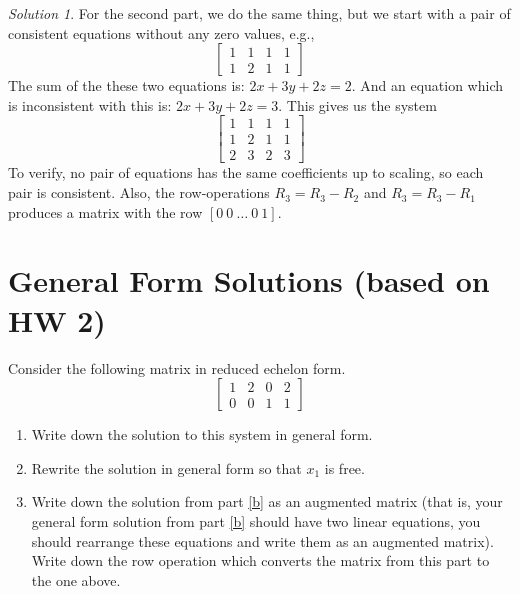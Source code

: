 \documentclass{article}
\theoremstyle{remark}
\newtheorem*{solution}{Solution}
\begin{document}
\begin{solution}
  For the second part, we do the same thing, but we start with a pair of consistent equations without any zero values, e.g.,
  \begin{displaymath}
    \begin{bmatrix}
      1 & 1 & 1 & 1 \\
      1 & 2 & 1 & 1
    \end{bmatrix}
  \end{displaymath}
  The sum of the these two equations is: $2x + 3y + 2z = 2$.
  And an equation which is inconsistent with this is: $2x + 3y + 2z = 3$.
  This gives us the system
  \begin{displaymath}
    \begin{bmatrix}
      1 & 1 & 1 & 1\\
      1 & 2 & 1 & 1\\
      2 & 3 & 2 & 3
    \end{bmatrix}
  \end{displaymath}
  To verify, no pair of equations has the same coefficients up to scaling, so each pair is consistent.
  Also, the row-operations $R_3 = R_3 - R_2$ and $R_3 = R_3 - R_1$ produces a matrix with the row $[0 \ 0 \ \dots \ 0 \ 1]$.
\end{solution}

\pagebreak
\section{General Form Solutions (based on HW 2)}
Consider the following matrix in reduced echelon form.
\begin{displaymath}
  \begin{bmatrix}
    1 & 2 & 0 & 2 \\
    0 & 0 & 1 & 1
  \end{bmatrix}
\end{displaymath}
\begin{enumerate}
\item Write down the solution to this system in general form.
\item\label{b} Rewrite the solution in general form so that $x_1$ is free.
\item\label{c} Write down the solution from part \ref{b} as an augmented matrix (that is, your general form solution from part \ref{b} should have two linear equations, you should rearrange these equations and write them as an augmented matrix).
  Write down the row operation which converts the matrix from this part to the one above.
\end{enumerate}
\end{document}
